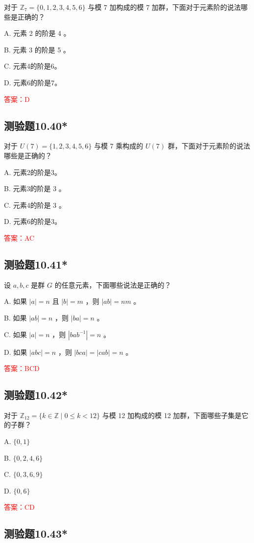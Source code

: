 \documentclass[UTF8, heading=true]{ctexart}
\begin{document}
对于 $\mathbb{Z}_7=\{0,1,2,3,4,5,6\}$ 与模 7 加构成的模 7 加群，下面对于元素阶的说法哪些是正确的？

A. 元素 2 的阶是 4 。

B. 元素 3 的阶是 5 。

C. 元素4的阶是6。

D. 元素6的阶是7。

\textcolor{red}{答案：D}


\subsection{测验题10.40*}

对于 $U(7)=\{1,2,3,4,5,6\}$ 与模 7 乘构成的 $U(7)$ 群，下面对于元素阶的说法哪些是正确的？

A. 元素2的阶是3。

B. 元素3的阶是 3 。

C. 元素4的阶是 3 。

D. 元素6的阶是3。

\textcolor{red}{答案：AC}

\subsection{测验题10.41*}

设 $a, b, c$ 是群 $G$ 的任意元素，下面哪些说法是正确的？

A. 如果 $|a|=n$ 且 $|b|=m$ ，则 $|a b|=n m$ 。

B. 如果 $|a b|=n$ ，则 $|b a|=n$ 。

C. 如果 $|a|=n$ ，则 $\left|b a b^{-1}\right|=n$ 。

D. 如果 $|a b c|=n$ ，则 $|b c a|=|c a b|=n$ 。


\textcolor{red}{答案：BCD}

\subsection{测验题10.42*}


对于 $\mathbb{Z}_{12}=\{k \in \mathbb{Z} \mid 0 \leq k<12\}$ 与模 12 加构成的模 12 加群，下面哪些子集是它的子群？

A. $\{0,1\}$

B. $\{0,2,4,6\}$

C. $\{0,3,6,9\}$

D. $\{0,6\}$

\textcolor{red}{答案：CD}

\subsection{测验题10.43*}
\end{document}
